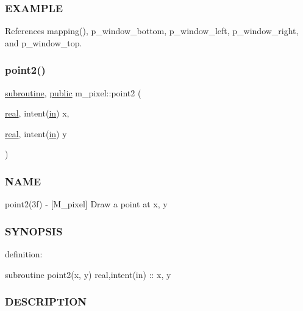 \subsubsection*{E\+X\+A\+M\+P\+LE}

References mapping(), p\+\_\+window\+\_\+bottom, p\+\_\+window\+\_\+left, p\+\_\+window\+\_\+right, and p\+\_\+window\+\_\+top.

\mbox{\label{namespacem__pixel_a11234e0b33104eb0afb24f928b072053}} 
\subsubsection{\texorpdfstring{point2()}{point2()}}
{\footnotesize\ttfamily \hyperlink{M__stopwatch_83_8txt_acfbcff50169d691ff02d4a123ed70482}{subroutine}, \hyperlink{M__stopwatch_83_8txt_a2f74811300c361e53b430611a7d1769f}{public} m\+\_\+pixel\+::point2 (\begin{DoxyParamCaption}\item[{\hyperlink{read__watch_83_8txt_abdb62bde002f38ef75f810d3a905a823}{real}, intent(\hyperlink{M__journal_83_8txt_afce72651d1eed785a2132bee863b2f38}{in})}]{x,  }\item[{\hyperlink{read__watch_83_8txt_abdb62bde002f38ef75f810d3a905a823}{real}, intent(\hyperlink{M__journal_83_8txt_afce72651d1eed785a2132bee863b2f38}{in})}]{y }\end{DoxyParamCaption})}



\subsubsection*{N\+A\+ME}

point2(3f) -\/ \mbox{[}M\+\_\+pixel\mbox{]} Draw a point at x, y 

\subsubsection*{S\+Y\+N\+O\+P\+S\+IS}

definition\+:

subroutine point2(x, y) real,intent(in) \+:\+: x, y

\subsubsection*{D\+E\+S\+C\+R\+I\+P\+T\+I\+ON}

